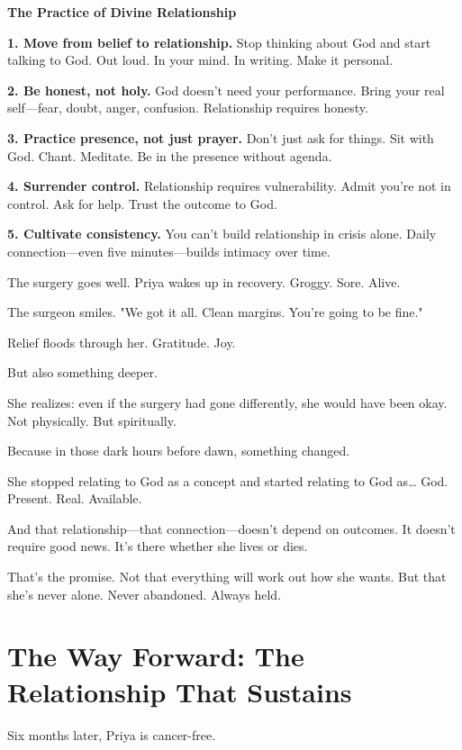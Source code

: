 \documentclass[11pt,twoside]{book}
\begin{document}
\begin{practicebox}
\textbf{The Practice of Divine Relationship}

\textbf{1. Move from belief to relationship.} Stop thinking about God and start talking to God. Out loud. In your mind. In writing. Make it personal.

\textbf{2. Be honest, not holy.} God doesn't need your performance. Bring your real self—fear, doubt, anger, confusion. Relationship requires honesty.

\textbf{3. Practice presence, not just prayer.} Don't just ask for things. Sit with God. Chant. Meditate. Be in the presence without agenda.

\textbf{4. Surrender control.} Relationship requires vulnerability. Admit you're not in control. Ask for help. Trust the outcome to God.

\textbf{5. Cultivate consistency.} You can't build relationship in crisis alone. Daily connection—even five minutes—builds intimacy over time.
\end{practicebox}

The surgery goes well. Priya wakes up in recovery. Groggy. Sore. Alive.

The surgeon smiles. "We got it all. Clean margins. You're going to be fine."

Relief floods through her. Gratitude. Joy.

But also something deeper.

She realizes: even if the surgery had gone differently, she would have been okay. Not physically. But spiritually.

Because in those dark hours before dawn, something changed.

She stopped relating to God as a concept and started relating to God as\ldots{} God. Present. Real. Available.

And that relationship—that connection—doesn't depend on outcomes. It doesn't require good news. It's there whether she lives or dies.

That's the promise. Not that everything will work out how she wants. But that she's never alone. Never abandoned. Always held.

\section*{The Way Forward: The Relationship That Sustains}

Six months later, Priya is cancer-free.
\end{document}
